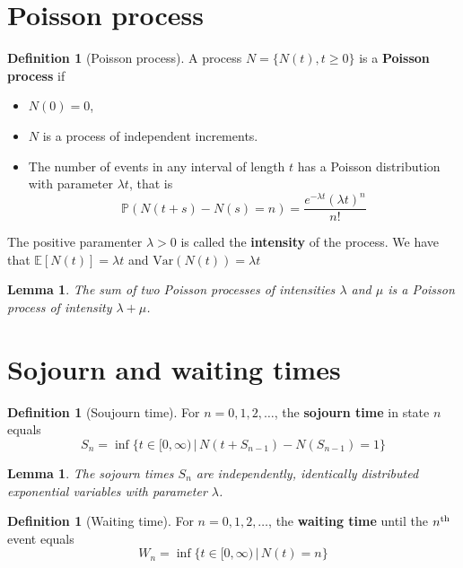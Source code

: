 \documentclass[10pt, oneside, reqno]{amsart}
\theoremstyle{plain}%
\newtheorem{lem}[thm]{Lemma}
\theoremstyle{definition}
\newtheorem{defn}[thm]{Definition}
\theoremstyle{remark}
\newcommand{\expc}[1]{\mathbb{E}\left[#1\right]}
\newcommand{\var}[1]{\text{Var}\left(#1\right)}
\newcommand{\prob}[1]{\mathbb{P}(#1)}
\newcommand{\given}{ \, | \,}
\newcommand{\nth}{n\textsuperscript{th}}
\begin{document}
\section{Poisson process} %
\label{sub:poisson_process}
\begin{defn}[Poisson process]
	A process $N = \{N(t), t \geq 0\}$ is a \textbf{Poisson process} if 
	\begin{itemize}
		\item $N(0) = 0$,
		\item $N$ is a process of independent increments.
		\item The number of events in any interval of length $t$ has a Poisson distribution with parameter $\lambda t$, that is \[
			\prob{N(t+s) - N(s) = n}  = \frac{e^{-\lambda t} (\lambda t)^n}{n!}
		\]
	\end{itemize}
	
	The positive paramenter $\lambda > 0$ is called the \textbf{intensity} of the process.  We have that $\expc{N(t)} = \lambda t$ and $\var{N(t)} = \lambda t$
\end{defn}

\begin{lem}
	The sum of two Poisson processes of intensities $\lambda$ and $\mu$ is a Poisson process of intensity $\lambda + \mu$.
\end{lem}


\section{Sojourn and waiting times} %
\label{sub:sojourn_and_waiting_times}

\begin{defn}[Soujourn time]
	For $n = 0,1,2,\dots$, the \textbf{sojourn time} in state $n$ equals \[
		S_n = \inf \{t \in [0, \infty) \given N(t + S_{n-1}) - N(S_{n-1}) = 1 \}
	\]
\end{defn}

\begin{lem}
	The sojourn times $S_n$ are independently, identically distributed exponential variables with parameter $\lambda$.
\end{lem}

\begin{defn}[Waiting time]
	For $n = 0,1,2,\dots$, the \textbf{waiting time} until the $\nth$ event equals \[
		W_n = \inf \{ t \in [0,\infty) \given N(t) = n\}
	\]
\end{defn}
\end{document}
